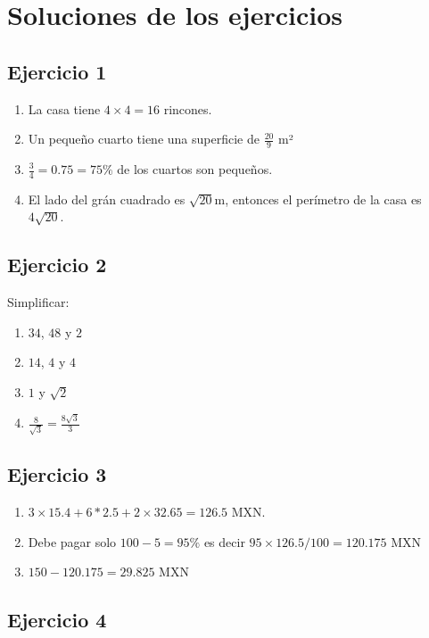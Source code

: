 \section{Soluciones de los ejercicios}

\subsection*{Ejercicio 1}

\begin{enumerate}
\item La casa tiene $4\times4=16$ rincones.
\item Un pequeño cuarto tiene una superficie de $\frac{20}{9}$ m²
\item $\frac{3}{4} = 0.75 = 75\%$ de los cuartos son pequeños.
\item El lado del grán cuadrado es $\sqrt{20}$m, entonces el perímetro de la 
  casa es $4 \sqrt{20}$.
\end{enumerate}

\subsection*{Ejercicio 2}

Simplificar:

\begin{enumerate}
\item $34$, $48$ y $2$
\item $14$, $4$ y $4$
\item $1$ y $\sqrt{2}$
\item $\frac{8}{\sqrt{3}} = \frac{8 \sqrt{3}}{3}$
\end{enumerate}

\subsection*{Ejercicio 3}

\begin{enumerate}
\item $3\times15.4 + 6 * 2.5 + 2 \times 32.65 = 126.5$ MXN.
\item Debe pagar solo $100 - 5 = 95\%$ es decir $95 \times 126.5 / 100 = 120.175$ MXN
\item $150 - 120.175 = 29.825$ MXN
\end{enumerate}

\subsection*{Ejercicio 4}

